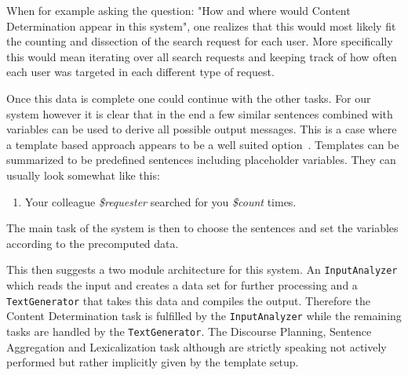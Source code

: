 \documentclass[sigconf,obeyspaces]{acmart}
\begin{document}
When for example asking the question: "How and where would Content Determination appear in this system", one realizes that this would most likely fit the counting and dissection of the search request for each user. More specifically this would mean iterating over all search requests and keeping track of how often each user was targeted in each different type of request.

Once this data is complete one could continue with the other tasks. For our system however it is clear that in the end a few similar sentences combined with variables can be used to derive all possible output messages. This is a case where a template based approach appears to be a well suited option~\cite[16]{gatt_Krahmer}. Templates can be summarized to be predefined sentences including placeholder variables. They can usually look somewhat like this:
\begin{enumerate}
    \item Your colleague \emph{\$requester} searched for you \emph{\$count} times.
\end{enumerate}
The main task of the system is then to choose the sentences and set the variables according to the precomputed data.

This then suggests a two module architecture for this system. An \texttt{InputAnalyzer} which reads the input and creates a data set for further processing and a \texttt{TextGenerator} that takes this data and compiles the output. Therefore the Content Determination task is fulfilled by the \texttt{InputAnalyzer} while the remaining tasks are handled by the \texttt{TextGenerator}. The Discourse Planning, Sentence Aggregation and Lexicalization task although are strictly speaking not actively performed but rather implicitly given by the template setup.
\end{document}
